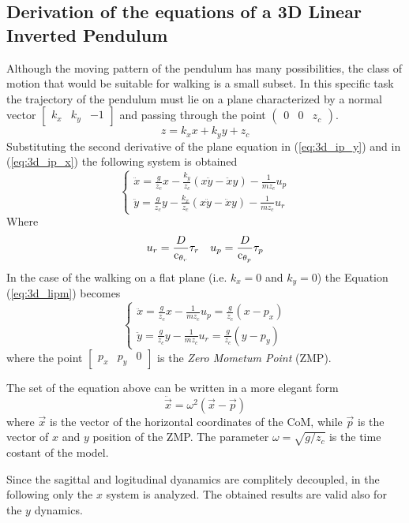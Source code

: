 \subsection{Derivation of the equations of a 3D Linear Inverted Pendulum}
Although the moving pattern of the pendulum has many possibilities, the class of motion that
would be suitable for walking is a small subset.
In this specific task the trajectory of the pendulum
must lie on a plane characterized by a normal vector
$\begin{bmatrix} k_x & k_y & -1 \end{bmatrix}$
and passing through the point $(\begin{matrix} 0 & 0 & z_c \end{matrix})$.
\[
z = k_x x + k_y y + z_c
\]
Substituting the second derivative of the plane equation in  (\ref{eq:3d_ip_y})
and in (\ref{eq:3d_ip_x}) the following system is obtained
\begin{equation}
  \label{eq:3d_lipm}
  \begin{cases}
    \ddot{x} = \frac{g}{z_c}x - \frac{k_y}{z_c}(x \ddot{y} - \ddot{x} y) - \frac{1}{m z_c} u_p\\
    \ddot{y} = \frac{g}{z_c}y - \frac{k_x}{z_c}(x \ddot{y} - \ddot{x} y) - \frac{1}{m z_c} u_r
  \end{cases}
\end{equation}
Where
\[
u_r = \frac{D}{\mathop{}\!\mathrm{c}_{\theta_r}} \tau_r \quad u_p = \frac{D}{\mathop{}\!\mathrm{c}_{\theta_p}} \tau_p
\]
In the case of the walking on a flat plane (i.e. $k_x = 0$ and $k_y = 0$)
the Equation (\ref{eq:3d_lipm}) becomes
\[
\begin{cases}
  \ddot{x} = \frac{g}{z_c}x - \frac{1}{m z_c} u_p = \frac{g}{z_c} (x - p_x)\\
  \ddot{y} = \frac{g}{z_c}y - \frac{1}{m z_c} u_r = \frac{g}{z_c} (y - p_y)
\end{cases}
\]
where the point $\begin{bmatrix} p_x & p_y & 0 \end{bmatrix}$ is the \emph{Zero Mometum Point} (ZMP).
\par
The set of the equation above can be written in a more elegant form
\[
\ddot{\vec{x}} = \omega^2 (\vec{x} - \vec{p})
\]
where $\vec{x}$ is the vector of the horizontal coordinates of the CoM, while $\vec{p}$ is the vector of $x$ and $y$ position of the ZMP. The parameter $\omega = \sqrt{g/z_c}$ is the time costant of the model.
\par
Since the sagittal and logitudinal dyanamics are complitely decoupled, in the following only the $x$ system is analyzed. The obtained results are valid also for the $y$ dynamics.
